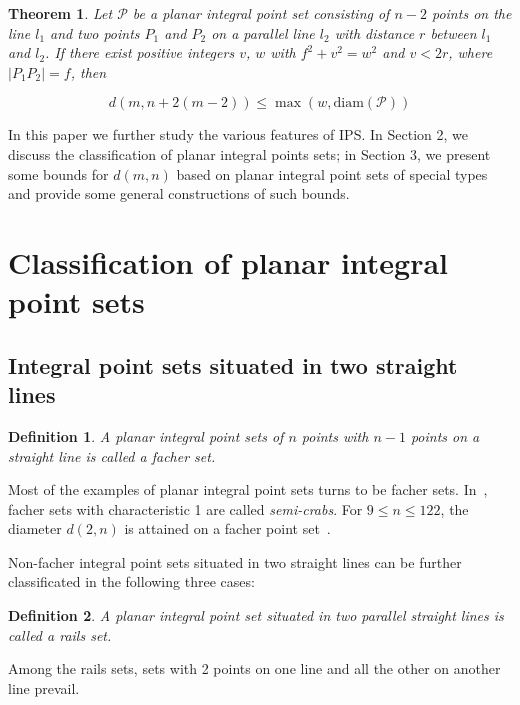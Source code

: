 \documentclass[12pt]{article}
\theoremstyle{theorem}
\newtheorem{theorem}{Theorem}
\theoremstyle{dfn}
\newtheorem{dfn}{Definition}
\theoremstyle{remark}
\begin{document}
\begin{theorem}
	\label{thm:Kurz_blowup}
	Let $\mathcal{P}$ be a planar integral point set consisting of
	$n - 2$ points on the line $l_1$ and two points $P_{1}$ and $P_{2}$ on a
	parallel line $l_2$ with distance $r$ between $l_{1}$ and $l_{2}$. If there
	exist positive integers $v$, $w$ with $f^{2} + v^{2}
	= w^{2}$ and $v < 2r$, where $|P_{1}P_{2}| = f$,
	then

	\begin{equation}\label{formula1}
		d(m, n + 2(m - 2)) \leq \max(w, \operatorname{diam(\mathcal{P})})
	\end{equation}

\end{theorem}

In this paper we further study the various features of IPS.
In Section 2, we discuss the classification of planar integral points sets;
in Section 3, we present some bounds for $d(m,n)$ based on planar integral point sets of special types
and provide some general constructions of such bounds.

\section{Classification of planar integral point sets}

\subsection{Integral point sets situated in two straight lines}

\begin{dfn}
	A planar integral point sets of $n$ points with $n-1$ points on a straight line is called
	a \textit{facher} set.
\end{dfn}
Most of the examples of planar integral point sets turns to be facher sets.
In~\cite{antonov2008maximal}, facher sets with characteristic 1 are called \textit{semi-crabs}.
For $9 \leq n \leq 122$, the diameter $d(2,n)$ is attained on a facher point set~\cite{kurz2008minimum}.

Non-facher integral point sets situated in two straight lines
can be further classificated in the following three cases:

\begin{dfn}
	A planar integral point set situated in two parallel straight lines
	is called a \textit{rails} set.
\end{dfn}

Among the rails sets, sets with 2 points on one line and all the other on another line prevail.
\end{document}
